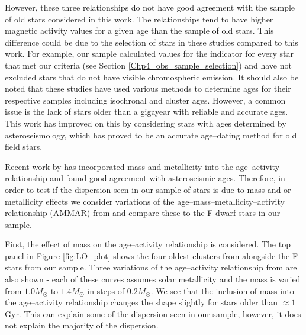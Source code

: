 However, these three relationships do not have good agreement with the sample of old stars considered in this work. The relationships tend to have higher magnetic activity values for a given age than the sample of old stars. This difference could be due to the selection of stars in these studies compared to this work. For example, our sample calculated values for the \Rprime indicator for every star that met our criteria (see Section \ref{Chp4_obs_sample_selection}) and have not excluded stars that do not have visible chromospheric emission. It should also be noted that these studies have used various methods to determine ages for their respective samples including isochronal and cluster ages. However, a common issue is the lack of stars older than a gigayear with reliable and accurate ages. This work has improved on this by considering stars with ages determined by asteroseismology, which has proved to be an accurate age--dating method for old field stars.

Recent work by \citet{Lorenzo_Oliveira_etal_2016} has incorporated mass and metallicity into the age--activity relationship and found good agreement with asteroseismic ages. Therefore, in order to test if the dispersion seen in our sample of stars is due to mass and or metallicity effects we consider variations of the age--mass--metallicity--activity relationship (AMMAR) from \citet{Lorenzo_Oliveira_etal_2016} and compare these to the F dwarf stars in our sample.

First, the effect of mass on the age--activity relationship is considered. The top panel in Figure \ref{fig:LO_plot} shows the four oldest clusters from \citet{Mamajek_Hillenbrand_2008} alongside the F stars from our sample. Three variations of the age--activity relationship from \citet{Lorenzo_Oliveira_etal_2016} are also shown - each of these curves assumes solar metallicity and the mass is varied from $1.0 M_{\odot}$ to $1.4 M_{\odot}$ in steps of $0.2 M_{\odot}$. We see that the inclusion of mass into the age--activity relationship changes the shape slightly for stars older than $\approx 1$ Gyr. This can explain some of the dispersion seen in our sample, however, it does not explain the majority of the dispersion.

